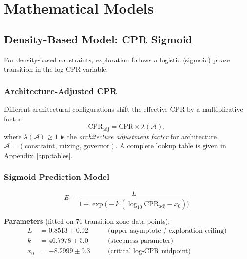 \documentclass[12pt,a4paper]{article}
\begin{document}
\section{Mathematical Models}\label{sec:models}

\subsection{Density-Based Model: CPR Sigmoid}\label{sec:sigmoid}

For density-based constraints, exploration follows a logistic (sigmoid) phase transition in the log-CPR variable.

\subsubsection{Architecture-Adjusted CPR}

Different architectural configurations shift the effective CPR by a multiplicative factor:
\begin{equation}\label{eq:adj_cpr}
    \mathrm{CPR}_{\text{adj}} = \mathrm{CPR} \times \lambda(\mathcal{A}),
\end{equation}
where $\lambda(\mathcal{A}) \geq 1$ is the \emph{architecture adjustment factor} for architecture $\mathcal{A} = (\text{constraint, mixing, governor})$. A complete lookup table is given in Appendix~\ref{app:tables}.

\subsubsection{Sigmoid Prediction Model}

\begin{equation}\label{eq:sigmoid}
\boxed{
    E = \frac{L}{1 + \exp\!\bigl(-k\,(\log_{10}\mathrm{CPR}_{\text{adj}} - x_{0})\bigr)}
}
\end{equation}

\noindent\textbf{Parameters} (fitted on 70 transition-zone data points):
\begin{align}
    L   &= 0.8513 \pm 0.02  \quad &&\text{(upper asymptote / exploration ceiling)} \label{eq:L}\\
    k   &= 46.7978 \pm 5.0  \quad &&\text{(steepness parameter)} \label{eq:k}\\
    x_{0} &= -8.2999 \pm 0.3 \quad &&\text{(critical log-CPR midpoint)} \label{eq:x0}
\end{align}
\end{document}
